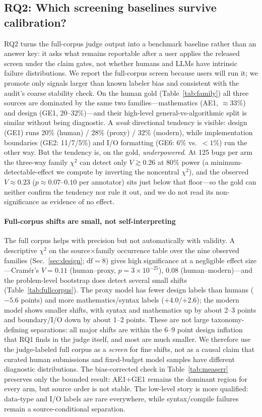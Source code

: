 \documentclass[conference]{IEEEtran}
\begin{document}
\subsection{RQ2: Which screening baselines survive calibration?}
\label{sec:rq2}
RQ2 turns the full-corpus judge output into a benchmark baseline rather than an
answer key: it asks what remains reportable after a user applies the released screen
under the claim gates, not whether humans and LLMs have intrinsic failure
distributions. We report the full-corpus screen because users will run it; we
promote only signals larger than known labeler bias and consistent with the audit's
coarse stability check. On the human gold (Table~\ref{tab:family}) all three sources
are dominated by the same two families---mathematics (AE1, $\approx$33\%) and design
(GE1, 20--32\%)---and their high-level general-vs-algorithmic split is similar
without being diagnostic. A \emph{weak} directional tendency is visible: design (GE1)
runs 20\% (human) / 28\% (proxy) / 32\% (modern), while implementation boundaries
(GE2: 11/7/5\%) and I/O formatting (GE6: 6\% vs.\ $<\!1\%$) run the other way. But the
tendency is, on the gold, \emph{underpowered}. At 125 bugs per arm the three-way
family $\chi^2$ can detect only $V\!\gtrsim\!0.26$ at 80\% power (a minimum-detectable-effect
we compute by inverting the noncentral $\chi^2$), and the observed
$V\!\approx\!0.23$ ($p\!\approx\!0.07$--$0.10$ per annotator) sits just below that
floor---so the gold can neither confirm the tendency nor rule it out, and we do not
read its non-significance as evidence of no effect.

\paragraph{Full-corpus shifts are small, not self-interpreting}
The full corpus helps with precision but not automatically with validity. A
descriptive $\chi^2$ on the source$\times$family occurrence table over the nine
observed families (Sec.~\ref{sec:design}; $\mathrm{df}=8$) gives high
significance at a negligible effect size---Cram\'er's $V=0.11$ (human--proxy,
$p\!=\!3\!\times\!10^{-25}$), $0.08$ (human--modern)---and the problem-level bootstrap
does detect several small shifts (Table~\ref{tab:fullcorpus}). The proxy model has
fewer design labels than humans ($-5.6$ points) and more mathematics/syntax labels
(+4.0/+2.6); the modern model shows smaller shifts, with syntax and mathematics up by
about 2--3 points and boundary/I/O down by about 1--2 points. These are not large
taxonomy-defining separations: all major shifts are within the 6--9 point design
inflation that RQ1 finds in the judge itself, and most are much smaller. We therefore
use the judge-labeled full corpus as a \emph{screen} for fine shifts, not as a causal
claim that curated human submissions and fixed-budget model samples have different
diagnostic distributions. The bias-corrected check in Table~\ref{tab:measerr}
preserves only the bounded result: AE1+GE1 remains the dominant region for every arm,
but source order is not stable. The low-level story is more qualified: data-type and
I/O labels are rare everywhere, while syntax/compile failures remain a
source-conditional separation.
\end{document}
